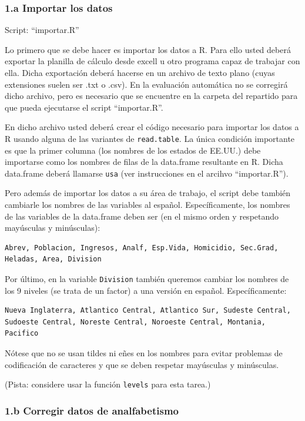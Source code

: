 \documentclass[]{article}
\begin{document}
\subsubsection{1.a Importar los datos}

Script: ``importar.R''

Lo primero que se debe hacer es importar los datos a R. Para ello usted
deberá exportar la planilla de cálculo desde excell u otro programa
capaz de trabajar con ella. Dicha exportación deberá hacerse en un
archivo de texto plano (cuyas extensiones suelen ser .txt o .csv). En la
evaluación automática no se corregirá dicho archivo, pero es necesario
que se encuentre en la carpeta del repartido para que pueda ejecutarse
el script ``importar.R''.

En dicho archivo usted deberá crear el código necesario para importar
los datos a R usando alguna de las variantes de \texttt{read.table}. La
única condición importante es que la primer columna (los nombres de los
estados de EE.UU.) debe importarse como los nombres de filas de la
data.frame resultante en R. Dicha data.frame deberá llamarse
\texttt{usa} (ver instrucciones en el arcihvo ``importar.R'').

Pero además de importar los datos a su área de trabajo, el script debe
también cambiarle los nombres de las variables al español.
Específicamente, los nombres de las variables de la data.frame deben ser
(en el mismo orden y respetando mayúsculas y minúsculas):

\begin{verbatim}
Abrev, Poblacion, Ingresos, Analf, Esp.Vida, Homicidio, Sec.Grad, 
Heladas, Area, Division
\end{verbatim}
Por último, en la variable \texttt{Division} también queremos cambiar
los nombres de los 9 niveles (se trata de un factor) a una versión en
español. Específicamente:

\begin{verbatim}
Nueva Inglaterra, Atlantico Central, Atlantico Sur, Sudeste Central,
Sudoeste Central, Noreste Central, Noroeste Central, Montania, Pacifico
\end{verbatim}
Nótese que no se usan tildes ni eñes en los nombres para evitar
problemas de codificación de caracteres y que se deben respetar
mayúsculas y minúsculas.

(Pista: considere usar la función \texttt{levels} para esta tarea.)

\subsubsection{1.b Corregir datos de analfabetismo}
\end{document}
